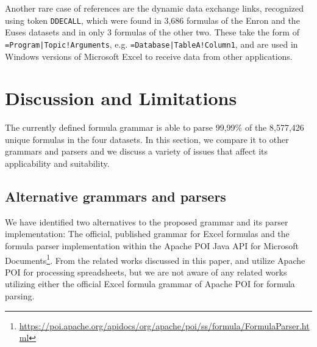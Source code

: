 \documentclass[times]{smrauth}
\begin{document}
Another rare case of references are the dynamic data exchange links, recognized using token \texttt{DDECALL}, which were found in 3,686 formulas of the Enron and the Euses datasets and in only 3 formulas of the other two. These take the form of \texttt{=Program|Topic!Arguments}, e.g. \texttt{=Database|TableA!Column1}, and are used in Windows versions of Microsoft Excel to receive  data from other applications.

 \noindent

\section{Discussion and Limitations}
\label{sec:discussion}
The currently defined formula grammar is able to parse 99,99\% of the 8,577,426 unique formulas in the four datasets. In this section, we compare it to other grammars and parsers and we discuss a variety of issues that affect its applicability and suitability.

\subsection{Alternative grammars and parsers}
\label{sec:comparisonGrammars}

We have identified two alternatives to the proposed grammar and its parser implementation: The official, published grammar for Excel formulas \cite{ExcelOfficialGrammar} and the  formula parser implementation within the Apache POI Java API for Microsoft Documents\footnote{\label{footnote:poi}\url{https://poi.apache.org/apidocs/org/apache/poi/ss/formula/FormulaParser.html}}. From the related works discussed in this paper, \cite{DouCACheck} and \cite{badame2012refactoring} utilize Apache POI for processing spreadsheets, but we are not aware of any related works utilizing either the official Excel formula grammar of Apache POI for formula parsing.
\end{document}
